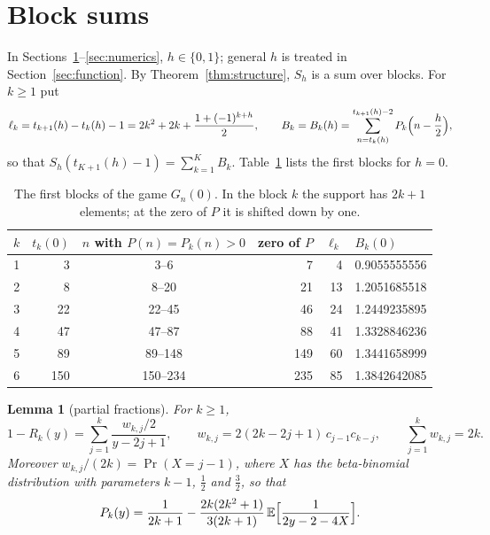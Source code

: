 \documentclass[11pt]{article}
\newtheorem{lemma}[theorem]{Lemma}
\theoremstyle{definition}
\theoremstyle{remark}
\newcommand{\E}{\mathbb{E}}
\begin{document}
\section{Block sums}\label{sec:blocks}

In Sections~\ref{sec:blocks}--\ref{sec:numerics}, $h\in\{0,1\}$; general
$h$ is treated in Section~\ref{sec:function}. By
Theorem~\ref{thm:structure}, $S_h$ is a sum over blocks. For $k\ge1$ put
\[
\ell_k=t_{k+1}(h)-t_k(h)-1=2k^2+2k+\frac{1+(-1)^{k+h}}2,\qquad
B_k=B_k(h)=\sum_{n=t_k(h)}^{t_{k+1}(h)-2}P_k\Bigl(n-\frac h2\Bigr),
\]
so that $S_h(t_{K+1}(h)-1)=\sum_{k=1}^{K}B_k$. Table~\ref{tab:blocks}
lists the first blocks for $h=0$.

\begin{table}[ht]
\centering
\begin{tabular}{rrcrrl}
\toprule
$k$ & $t_k(0)$ & $n$ with $P(n)=P_k(n)>0$ & zero of $P$ & $\ell_k$ & $B_k(0)$\\
\midrule
1 & 3 & 3--6 & 7 & 4 & 0.9055555556\\
2 & 8 & 8--20 & 21 & 13 & 1.2051685518\\
3 & 22 & 22--45 & 46 & 24 & 1.2449235895\\
4 & 47 & 47--87 & 88 & 41 & 1.3328846236\\
5 & 89 & 89--148 & 149 & 60 & 1.3441658999\\
6 & 150 & 150--234 & 235 & 85 & 1.3842642085\\
\bottomrule
\end{tabular}
\caption{The first blocks of the game $G_n(0)$. In the block $k$ the
support has $2k+1$ elements; at the zero of $P$ it is shifted down by
one.}
\label{tab:blocks}
\end{table}

\begin{lemma}[partial fractions]\label{lem:pf}
For $k\ge1$,
\[
1-R_k(y)=\sum_{j=1}^{k}\frac{w_{k,j}/2}{y-2j+1},\qquad
w_{k,j}=2(2k-2j+1)\,c_{j-1}c_{k-j},\qquad \sum_{j=1}^kw_{k,j}=2k.
\]
Moreover $w_{k,j}/(2k)=\Pr(X=j-1)$, where $X$ has the beta-binomial
distribution with parameters $k-1$, $\frac12$ and $\frac32$, so that
\begin{equation}\label{eq:P-mixture}
P_k(y)=\frac1{2k+1}-\frac{2k(2k^2+1)}{3(2k+1)}\,
\E\Bigl[\frac1{2y-2-4X}\Bigr].
\end{equation}
\end{lemma}
\end{document}
